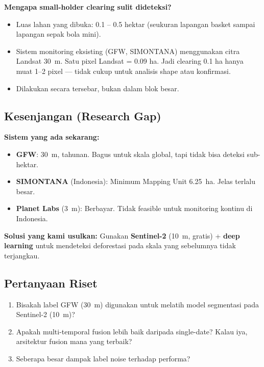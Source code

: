 \documentclass[10pt,a4paper,onecolumn]{article}
\begin{document}
\textbf{Mengapa small-holder clearing sulit dideteksi?}
\begin{itemize}[nosep]
    \item Luas lahan yang dibuka: 0.1 -- 0.5 hektar (seukuran
          lapangan basket sampai lapangan sepak bola mini).
    \item Sistem monitoring eksisting (GFW, SIMONTANA) menggunakan
          citra Landsat 30~m. Satu pixel Landsat = 0.09 ha. Jadi
          clearing 0.1 ha hanya muat 1--2 pixel — tidak cukup untuk
          analisis shape atau konfirmasi.
    \item Dilakukan secara tersebar, bukan dalam blok besar.
\end{itemize}

\subsection{Kesenjangan (Research Gap)}
\textbf{Sistem yang ada sekarang:}
\begin{itemize}[nosep]
    \item \textbf{GFW}: 30~m, tahunan. Bagus untuk skala global, tapi
          tidak bisa deteksi sub-hektar.
    \item \textbf{SIMONTANA} (Indonesia): Minimum Mapping Unit 6.25~ha.
          Jelas terlalu besar.
    \item \textbf{Planet Labs} (3~m): Berbayar. Tidak feasible untuk
          monitoring kontinu di Indonesia.
\end{itemize}

\textbf{Solusi yang kami usulkan:}
Gunakan \textbf{Sentinel-2} (10~m, gratis) + \textbf{deep learning}
untuk mendeteksi deforestasi pada skala yang sebelumnya tidak
terjangkau.

\subsection{Pertanyaan Riset}
\begin{enumerate}[nosep]
    \item Bisakah label GFW (30~m) digunakan untuk melatih model
          segmentasi pada Sentinel-2 (10~m)?
    \item Apakah multi-temporal fusion lebih baik daripada
          single-date? Kalau iya, arsitektur fusion mana yang terbaik?
    \item Seberapa besar dampak label noise terhadap performa?
\end{enumerate}

\end{document}
